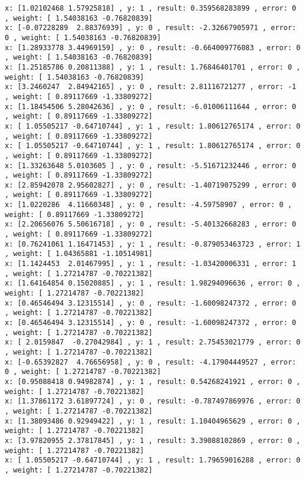 \documentclass[11pt]{article}
\begin{document}
    \begin{Verbatim}[commandchars=\\\{\}]
x: [1.02102468 1.57925818] , y: 1 , result: 0.359568283899 , error: 0 , weight: [ 1.54038163 -0.76820839]
x: [-0.07228289  2.88376939] , y: 0 , result: -2.32667905971 , error: 0 , weight: [ 1.54038163 -0.76820839]
x: [1.28933778 3.44969159] , y: 0 , result: -0.664009776083 , error: 0 , weight: [ 1.54038163 -0.76820839]
x: [1.25185786 0.20811388] , y: 1 , result: 1.76846401701 , error: 0 , weight: [ 1.54038163 -0.76820839]
x: [3.2460247  2.84942165] , y: 0 , result: 2.81116721277 , error: -1 , weight: [ 0.89117669 -1.33809272]
x: [1.18454506 5.28042636] , y: 0 , result: -6.01006111644 , error: 0 , weight: [ 0.89117669 -1.33809272]
x: [ 1.05505217 -0.64710744] , y: 1 , result: 1.80612765174 , error: 0 , weight: [ 0.89117669 -1.33809272]
x: [ 1.05505217 -0.64710744] , y: 1 , result: 1.80612765174 , error: 0 , weight: [ 0.89117669 -1.33809272]
x: [1.33263648 5.0103605 ] , y: 0 , result: -5.51671232446 , error: 0 , weight: [ 0.89117669 -1.33809272]
x: [2.85942078 2.95602827] , y: 0 , result: -1.40719075299 , error: 0 , weight: [ 0.89117669 -1.33809272]
x: [1.0220286  4.11660348] , y: 0 , result: -4.59758907 , error: 0 , weight: [ 0.89117669 -1.33809272]
x: [2.20656076 5.50616718] , y: 0 , result: -5.40132668283 , error: 0 , weight: [ 0.89117669 -1.33809272]
x: [0.76241061 1.16471453] , y: 1 , result: -0.879053463723 , error: 1 , weight: [ 1.04365881 -1.10514981]
x: [1.1424453  2.01467995] , y: 1 , result: -1.03420006331 , error: 1 , weight: [ 1.27214787 -0.70221382]
x: [1.64164854 0.15020885] , y: 1 , result: 1.98294096636 , error: 0 , weight: [ 1.27214787 -0.70221382]
x: [0.46546494 3.12315514] , y: 0 , result: -1.60098247372 , error: 0 , weight: [ 1.27214787 -0.70221382]
x: [0.46546494 3.12315514] , y: 0 , result: -1.60098247372 , error: 0 , weight: [ 1.27214787 -0.70221382]
x: [ 2.0159847  -0.27042984] , y: 1 , result: 2.75453021779 , error: 0 , weight: [ 1.27214787 -0.70221382]
x: [-0.65392827  4.76656958] , y: 0 , result: -4.17904449527 , error: 0 , weight: [ 1.27214787 -0.70221382]
x: [0.95088418 0.94982874] , y: 1 , result: 0.54268241921 , error: 0 , weight: [ 1.27214787 -0.70221382]
x: [1.37861172 3.61897724] , y: 0 , result: -0.787497869976 , error: 0 , weight: [ 1.27214787 -0.70221382]
x: [1.38093486 0.92949422] , y: 1 , result: 1.10404965629 , error: 0 , weight: [ 1.27214787 -0.70221382]
x: [3.97820955 2.37817845] , y: 1 , result: 3.39088102869 , error: 0 , weight: [ 1.27214787 -0.70221382]
x: [ 1.05505217 -0.64710744] , y: 1 , result: 1.79659016288 , error: 0 , weight: [ 1.27214787 -0.70221382]

\end{Verbatim}
\end{document}
